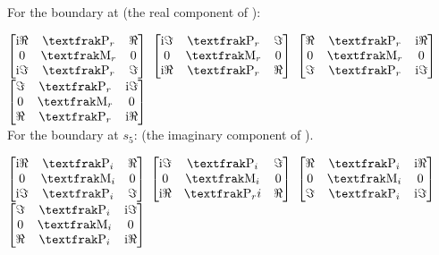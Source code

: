 \documentclass[]{iucr}              %
\numberwithin{equation}{section}
\begin{document}
	For the boundary at \sii{} (the real component of \cii{}):
	
	$\begin{bmatrix}
	
	\textrm{i}\Re{} & \Plus{}_r & \Re{} \\
	0 & \Minus{}_r & 0 \\
	\textrm{i}\Im{} & \Plus{}_r & \Im{}
\end{bmatrix}$
%
$\begin{bmatrix}
	\textrm{i}\Im{} & \Plus{}_r &  \Im{} \\
	0 & \Minus{}_r & 0 \\
	\textrm{i}\Re{} & \Plus{}_r & \Re{} \\
\end{bmatrix}$ 
%
$\begin{bmatrix}
	\Re{} &\Plus{}_r &   \textrm{i}\Re{} \\
	0 & \Minus{}_r &  0 \\
	\Im{} &\Plus{}_r & \textrm{i}\Im{}
\end{bmatrix}	$ 
%
$\begin{bmatrix}
	\Im{} & \Plus{}_r & \textrm{i}\Im{} \\
	0 &\Minus{}_r &  0 \\
	\Re{} & \Plus{}_r &  \textrm{i}\Re{} \\
\end{bmatrix}$ \\


For the boundary at $s_5$: (the imaginary component of \cii{}).

$\begin{bmatrix}
\textrm{i}\Re{} & \Plus{}_i & \Re{} \\
0 & \Minus{}_i & 0 \\
\textrm{i}\Im{} & \Plus{}_i & \Im{}
\end{bmatrix}$
%
$\begin{bmatrix}
\textrm{i}\Im{} & \Plus{}_i &  \Im{} \\
0 & \Minus{}_i & 0 \\
\textrm{i}\Re{} & \Plus{}_ri& \Re{} \\
\end{bmatrix}$ 
%
$\begin{bmatrix}
\Re{} &\Plus{}_i &   \textrm{i}\Re{} \\
0 & \Minus{}_i &  0 \\
\Im{} &\Plus{}_i & \textrm{i}\Im{}
\end{bmatrix}	$ 
%
$\begin{bmatrix}
\Im{} & \Plus{}_i & \textrm{i}\Im{} \\
0 &\Minus{}_i &  0 \\
\Re{} & \Plus{}_i &  \textrm{i}\Re{} \\
\end{bmatrix}$ \\
\end{document}
